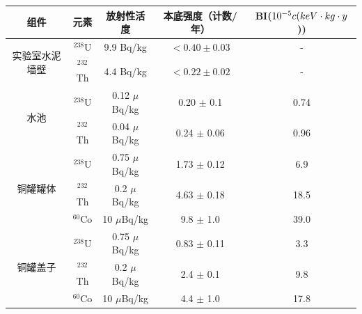 \begin{table}[htb]
    \centering
    \begin{tabular*}{0.95\textwidth}{@{\extracolsep{\fill}}ccccc}
      \hline
      \hline
      \textbf{组件}&\textbf{元素}&\textbf{放射性活度}&\textbf{本底强度（计数/年）}&\textbf{ BI($10^{-5}c\/(keV\cdot kg\cdot y$))}\\
      \hline
      \multirow{2}{4em}{实验室水泥墙壁} & $^{238}$U  &  9.9 Bq/kg & $<0.40\pm0.03$  & -  \\
                                        & $^{232}$Th &  4.4 Bq/kg &  $<0.22\pm0.02$  & - \\ \hline
  
      \multirow{2}{4em}{水池} & $^{238}$U  & 0.12 $\mu$Bq/kg & 0.20 $\pm$ 0.1 &  0.74  \\
                                             & $^{232}$Th & 0.04 $\mu$Bq/kg & 0.24  $\pm$ 0.06 & 0.96 \\ \hline
      \multirow{3}{4em}{铜罐罐体}              & $^{238}$U  &  0.75 $\mu$Bq/kg & 1.73  $\pm$ 0.12 &  6.9  \\
                                             & $^{232}$Th & 0.2  $\mu$Bq/kg & 4.63  $\pm$ 0.18 & 18.5 \\
                                             & $^{60}$Co  & 10 $\mu$Bq/kg & 9.8  $\pm$ 1.0 &  39.0  \\ \hline
  
      \multirow{3}{4em}{铜罐盖子}            & $^{238}$U  & 0.75 $\mu$Bq/kg  & 0.83  $\pm$ 0.11 &  3.3 \\
                                             & $^{232}$Th & 0.2 $\mu$Bq/kg & 2.4  $\pm$ 0.1 &  9.8 \\
                                             & $^{60}$Co  & 10 $\mu$Bq/kg & 4.4  $\pm$ 1.0 &  17.8  \\ \hline
  

\end{tabular*}
\end{table}

